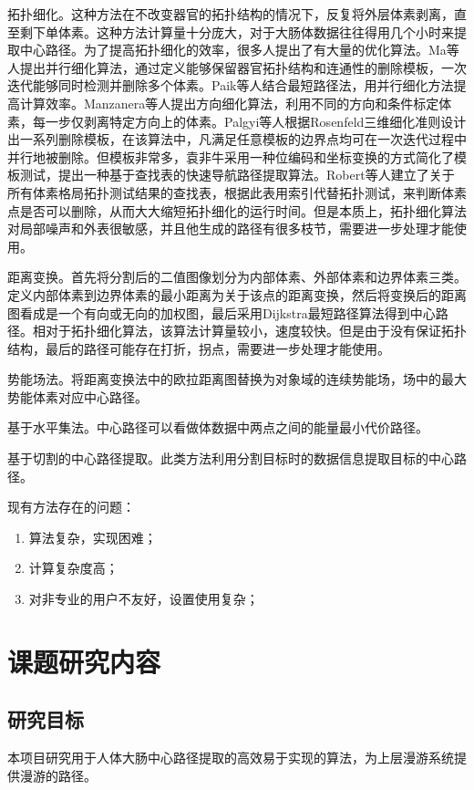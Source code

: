 拓扑细化。这种方法在不改变器官的拓扑结构的情况下，反复将外层体素剥离，直至剩下单体素。这种方法计算量十分庞大，对于大肠体数据往往得用几个小时来提取中心路径。为了提高拓扑细化的效率，很多人提出了有大量的优化算法。Ma等人提出并行细化算法，通过定义能够保留器官拓扑结构和连通性的删除模板，一次迭代能够同时检测并删除多个体素。Paik等人结合最短路径法，用并行细化方法提高计算效率。Manzanera等人提出方向细化算法，利用不同的方向和条件标定体素，每一步仅剥离特定方向上的体素。Palgyi等人根据Rosenfeld三维细化准则设计出一系列删除模板，在该算法中，凡满足任意模板的边界点均可在一次迭代过程中并行地被删除。但模板非常多，袁非牛采用一种位编码和坐标变换的方式简化了模板测试，提出一种基于查找表的快速导航路径提取算法。Robert等人建立了关于所有体素格局拓扑测试结果的查找表，根据此表用索引代替拓扑测试，来判断体素点是否可以删除，从而大大缩短拓扑细化的运行时间。但是本质上，拓扑细化算法对局部噪声和外表很敏感，并且他生成的路径有很多枝节，需要进一步处理才能使用。

距离变换。首先将分割后的二值图像划分为内部体素、外部体素和边界体素三类。定义内部体素到边界体素的最小距离为关于该点的距离变换，然后将变换后的距离图看成是一个有向或无向的加权图，最后采用Dijkstra最短路径算法得到中心路径。相对于拓扑细化算法，该算法计算量较小，速度较快。但是由于没有保证拓扑结构，最后的路径可能存在打折，拐点，需要进一步处理才能使用。

势能场法。将距离变换法中的欧拉距离图替换为对象域的连续势能场，场中的最大势能体素对应中心路径。

基于水平集法。中心路径可以看做体数据中两点之间的能量最小代价路径。

基于切割的中心路径提取。此类方法利用分割目标时的数据信息提取目标的中心路径。

现有方法存在的问题：
\begin{enumerate}
    \item 算法复杂，实现困难；
    \item 计算复杂度高；
　　\item 对非专业的用户不友好，设置使用复杂；
\end{enumerate}

\section{课题研究内容}
\subsection{研究目标}
本项目研究用于人体大肠中心路径提取的高效易于实现的算法，为上层漫游系统提供漫游的路径。

